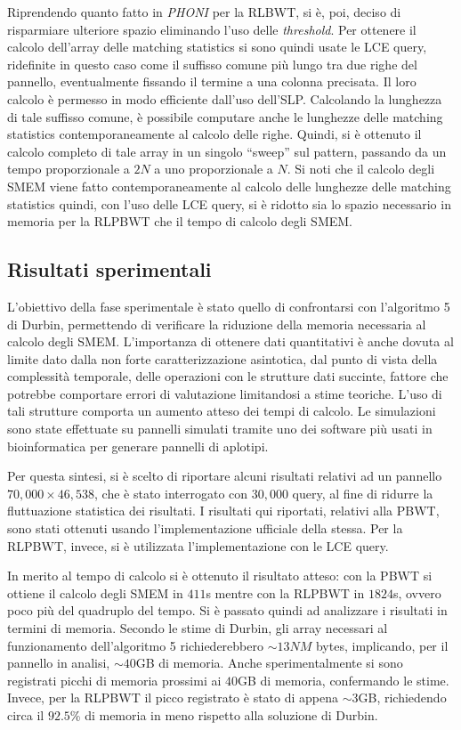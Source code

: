 \documentclass[a4paper,11pt, oneside,italian]{article}
\begin{document}
Riprendendo quanto fatto in \textit{PHONI} per
la RLBWT, si è, poi, deciso di risparmiare ulteriore spazio eliminando
l'uso delle \textit{threshold}. Per ottenere il calcolo dell'array delle
matching statistics si sono quindi usate le LCE query, ridefinite in questo caso
come il suffisso comune più lungo tra due righe del pannello, eventualmente
fissando il termine a una colonna precisata. Il loro calcolo è permesso
in modo efficiente dall'uso dell'SLP. Calcolando la
lunghezza di tale suffisso comune, è possibile computare anche le
lunghezze delle matching statistics contemporaneamente al calcolo delle
righe. Quindi, si è ottenuto il calcolo completo di tale array in
un singolo ``sweep'' sul pattern, passando da un tempo proporzionale a
$2N$ a uno proporzionale a $N$. Si noti che il calcolo degli SMEM viene fatto
contemporaneamente al calcolo delle lunghezze delle matching statistics quindi,
con l'uso delle LCE query, si è ridotto sia lo spazio necessario in memoria per
la RLPBWT che il tempo di calcolo degli SMEM.

\subsection*{Risultati sperimentali}
L'obiettivo della fase sperimentale è stato quello di confrontarsi con
l'algoritmo 5 di Durbin, permettendo di verificare la
riduzione della memoria necessaria al calcolo degli SMEM. L'importanza di
ottenere dati quantitativi è anche dovuta al limite 
dato dalla non forte caratterizzazione asintotica, dal punto di vista della
complessità temporale, delle operazioni con le strutture dati succinte, fattore
che potrebbe comportare errori di 
valutazione limitandosi a stime teoriche. L'uso di tali strutture comporta un
aumento atteso  
dei tempi di calcolo. Le simulazioni sono state effettuate su pannelli simulati
tramite uno dei software più usati in bioinformatica per generare pannelli di
aplotipi. 

Per questa sintesi, si è scelto di riportare alcuni risultati relativi ad un
pannello $70,000 \times 46,538$, che è stato interrogato con $30,000$ query, al
fine di ridurre la fluttuazione statistica dei risultati.
I risultati qui riportati, relativi alla PBWT, sono stati ottenuti usando
l'implementazione ufficiale della stessa. Per la RLPBWT, invece, si è utilizzata
l'implementazione con le LCE query. 

In merito al tempo di calcolo si è ottenuto il risultato atteso: con
la PBWT si ottiene il calcolo degli SMEM in $411$s 
mentre con la RLPBWT in $1824$s, ovvero poco più del quadruplo del tempo.
Si è passato quindi ad analizzare i risultati in termini di memoria. Secondo le
stime di Durbin, gli array necessari al funzionamento dell'algoritmo 5
richiederebbero $\sim 13NM$ bytes, implicando, per il pannello in analisi, $\sim
40$GB di memoria. Anche sperimentalmente si sono registrati 
picchi di memoria prossimi ai $40$GB di memoria, confermando le stime. Invece,
per la RLPBWT il picco registrato è stato di appena $\sim 3$GB, richiedendo
circa il $92.5$\% di memoria in meno rispetto alla soluzione di Durbin.
\end{document}
